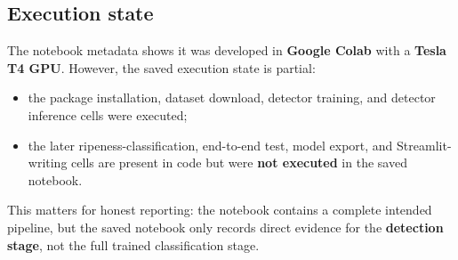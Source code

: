 \documentclass[12pt,a4paper]{article}
\begin{document}
\subsection{Execution state}
The notebook metadata shows it was developed in \textbf{Google Colab} with a \textbf{Tesla T4 GPU}. However, the saved execution state is partial:
\begin{itemize}
    \item the package installation, dataset download, detector training, and detector inference cells were executed;
    \item the later ripeness-classification, end-to-end test, model export, and Streamlit-writing cells are present in code but were \textbf{not executed} in the saved notebook.
\end{itemize}

This matters for honest reporting: the notebook contains a complete intended pipeline, but the saved notebook only records direct evidence for the \textbf{detection stage}, not the full trained classification stage.
\end{document}
